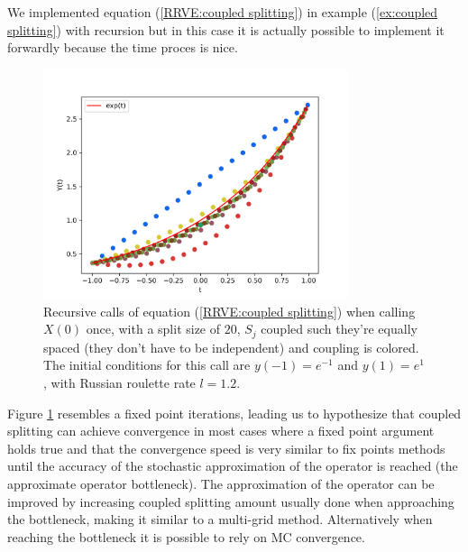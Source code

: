 \documentclass[a4paper,12pt]{article}
\begin{document}
\begin{pythonn} \label{py:coupled splitting}
    We implemented equation (\ref{RRVE:coupled splitting}) in example
    (\ref{ex:coupled splitting}) with recursion but in this case it
    is actually possible to implement it forwardly because the time
    proces is nice. \\

    \begin{figure}[h!]
        \centering
        \includegraphics[width=0.8\textwidth]{plots/coupled split.png}
        \caption{Recursive calls of equation (\ref{RRVE:coupled splitting}) when
        calling $X(0)$ once,
        with a split size of $20$, $S_{j}$ coupled such
        they're equally spaced (they don't have to be independent) and coupling is colored.
        The initial conditions for this call are $y(-1)=e^{-1}$ and $y(1)=e^{1}$,
        with Russian roulette rate $l=1.2$.  }
        \label{fig:coupled splitting}
    \end{figure}
\end{pythonn}


Figure \ref{fig:coupled splitting}
resembles a fixed point iterations, leading us to hypothesize
that coupled splitting can achieve convergence in most cases
where a fixed point argument holds true and that the convergence
speed is very similar to fix points methods until the accuracy
of the stochastic approximation of the operator is reached
(the approximate operator bottleneck). The approximation of the operator
can be improved by increasing coupled splitting amount usually done when
approaching the bottleneck,
making it similar to a multi-grid method. Alternatively when reaching
the bottleneck it is possible to rely on MC convergence.
\\
\end{document}
